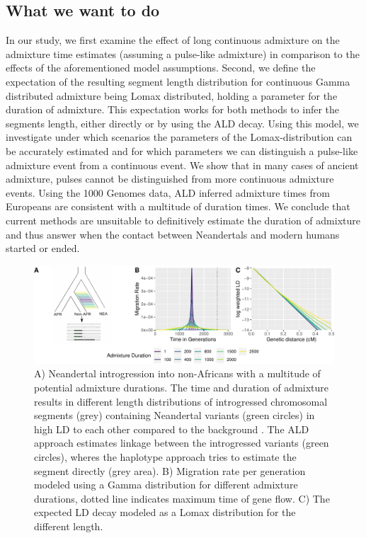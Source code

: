 \documentclass[]{article}
\begin{document}
\subsection{What we want to do}\label{what-we-want-to-do}
In our  study, we first examine the  effect of long
continuous admixture on the admixture time estimates (assuming a pulse-like admixture) in comparison to
the effects of the aforementioned model assumptions. Second, we define
the expectation of the resulting segment length distribution for
continuous Gamma distributed admixture being Lomax distributed, holding
a parameter for the duration of admixture. This expectation works for
both methods to infer the segments length, either directly or by using
the ALD decay. Using this model, we investigate under which scenarios
the parameters of the Lomax-distribution can be accurately estimated and
for which parameters we can distinguish a pulse-like admixture event
from a continuous event. We show that in many cases of ancient admixture, pulses cannot be
distinguished from more continuous admixture events. Using the 1000 Genomes data, ALD inferred admixture times from Europeans are consistent with a multitude of duration times.
We conclude that current
methods are unsuitable to definitively estimate the duration of admixture and thus answer when the contact between
Neandertals and modern humans started or ended.

\begin{figure}
\centering
\includegraphics{Admixture_Time_Inference_Paper_Draft_files/figure-latex/fig1-1.pdf}
\caption{\label{fig:fig1} A) Neandertal introgression into non-Africans with a multitude of potential admixture durations. The time and duration of admixture results in different length distributions of introgressed chromosomal segments (grey) containing  Neandertal variants (green circles)  in high LD to each other
compared to the background . The ALD approach estimates linkage
between the introgressed variants (green circles), wheres the haplotype approach tries
to estimate the segment directly (grey area). B) Migration rate per generation
modeled using a Gamma distribution for different admixture durations,
dotted line indicates maximum time of gene flow. C) The expected LD
decay modeled as a Lomax distribution for the different length.}
\end{figure}
\end{document}
